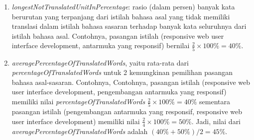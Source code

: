 \documentclass[../main/main.tex]{subfiles}
\begin{document}
\begin{enumerate}
\item \textit{longestNotTranslatedUnitInPercentage}: rasio (dalam persen) banyak kata berurutan yang terpanjang dari istilah bahasa asal yang tidak memiliki translasi dalam istilah bahasa sasaran terhadap banyak kata seluruhnya dari istilah bahasa asal. Contohnya, pasangan istilah (responsive web user interface development, antarmuka yang responsif) bernilai $\frac{2}{5} \times 100\% = 40\%$.
\item \textit{averagePercentageOfTranslatedWords}, yaitu rata-rata dari \textit{percentageOfTranslatedWords} untuk 2 kemungkinan pemilihan pasangan bahasa asal-sasaran. Contohnya, Contohnya, pasangan istilah (responsive web user interface development, pengembangan antarmuka yang responsif) memiliki nilai \textit{percentageOfTranslatedWords} $\frac{2}{5} \times 100\% = 40\%$ sementara pasangan istilah (pengembangan antarmuka yang responsif, responsive web user interface development) memiliki nilai $\frac{2}{4} \times 100\% = 50\%$. Jadi, nilai dari \textit{averagePercentageOfTranslatedWords} adalah $(40\% + 50\%) / 2 = 45\%$.
\end{enumerate}
\end{document}
